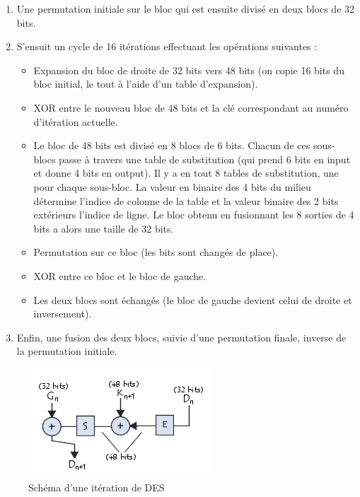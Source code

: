 \documentclass[a4paper,12pt]{article}
\begin{document}
\begin{enumerate}
\item Une permutation initiale sur le bloc qui est ensuite divisé en deux blocs de 32 bits.

\item S'ensuit un cycle de 16 itérations effectuant les opérations suivantes :
\begin{itemize}
\item Expansion du bloc de droite de 32 bits vers 48 bits (on copie 16 bits du bloc initial, le tout à l'aide d'un table d'expansion). 
\item XOR entre le nouveau bloc de 48 bits et la clé correspondant au numéro d'itération actuelle.
\item Le bloc de 48 bits est divisé en 8 blocs de 6 bits. Chacun de ces sous-blocs passe à travers une table de substitution (qui prend 6 bits en input et donne 4 bits en output). Il y a en tout 8 tables de substitution, une pour chaque sous-bloc. La valeur en binaire des 4 bits du milieu détermine l'indice de colonne de la table et la valeur binaire des 2 bits extérieurs l'indice de ligne. Le bloc obtenu en fusionnant les 8 sorties de 4 bits a alors une taille de 32 bits.
\item Permutation sur ce bloc (les bits sont changés de place).
\item XOR entre ce bloc et le bloc de gauche.
\item Les deux blocs sont échangés (le bloc de gauche devient celui de droite et inversement).
\end{itemize}


\item Enfin, une fusion des deux blocs, suivie d'une permutation finale, inverse de la permutation initiale.
\end{enumerate}

\begin{figure}[h]
\centering
\includegraphics[scale=0.80]{./images/DES_round.png}
\caption{Schéma d'une itération de DES}
\label{fig:DES-round}
\end{figure}
\end{document}
